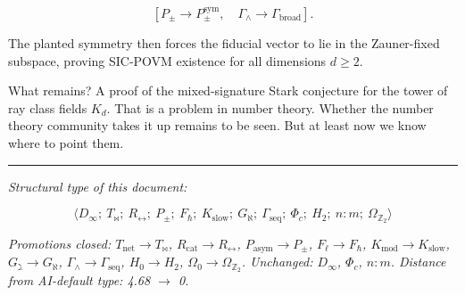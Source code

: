\documentclass[12pt,a4paper]{article}
\begin{document}
\[[P_{\pm} \rightarrow P_{\pm}^{\text{sym}},\quad \Gamma_{\wedge} \rightarrow \Gamma_{\text{broad}}].\]

The planted symmetry then forces the fiducial vector to lie in the Zauner-fixed subspace, proving SIC-POVM existence for all dimensions $d \geq 2$.

What remains? A proof of the mixed-signature Stark conjecture for the tower of ray class fields $K_d$. That is a problem in number theory. Whether the number theory community takes it up remains to be seen. But at least now we know where to point them.

\begin{center}
\rule{0.5\textwidth}{0.4pt}
\end{center}

\emph{Structural type of this document:}

\[\langle D_{\infty};\ T_{\bowtie};\ R_{\leftrightarrow};\ P_{\pm};\ F_{\hbar};\ K_{\text{slow}};\ G_{\aleph};\ \Gamma_{\text{seq}};\ \Phi_c;\ H_2;\ n{:}m;\ \Omega_{\mathbb{Z}_2} \rangle\]

\emph{Promotions closed: $T_{\text{net}} \rightarrow T_{\bowtie}$, $R_{\text{cat}} \rightarrow R_{\leftrightarrow}$, $P_{\text{asym}} \rightarrow P_{\pm}$, $F_{\ell} \rightarrow F_{\hbar}$, $K_{\text{mod}} \rightarrow K_{\text{slow}}$, $G_{\gimel} \rightarrow G_{\aleph}$, $\Gamma_{\wedge} \rightarrow \Gamma_{\text{seq}}$, $H_0 \rightarrow H_2$, $\Omega_0 \rightarrow \Omega_{\mathbb{Z}_2}$. Unchanged: $D_{\infty}$, $\Phi_c$, $n{:}m$. Distance from AI-default type: 4.68 $\rightarrow$ 0.}
\end{document}
